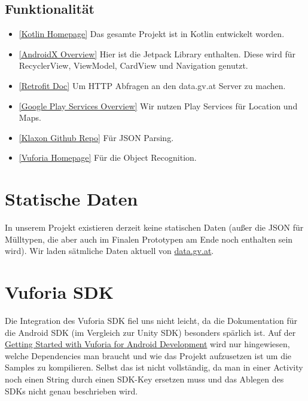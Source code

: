\documentclass{mrtrash}
\begin{document}
\subsection{Funktionalität}

\begin{itemize}
    \item \href{https://kotlinlang.org/}{[Kotlin Homepage]} Das gesamte Projekt ist in Kotlin entwickelt worden.
    \item \href{https://developer.android.com/jetpack/androidx}{[AndroidX Overview]} Hier ist die Jetpack Library enthalten. Diese wird für RecyclerView, ViewModel, CardView und Navigation genutzt.
    \item \href{https://square.github.io/retrofit/}{[Retrofit Doc]} Um HTTP Abfragen an den data.gv.at Server zu machen.
    \item \href{https://developers.google.com/android/guides/overview}{[Google Play Services Overview]} Wir nutzen Play Services für Location und Maps.
    \item \href{https://github.com/cbeust/klaxon}{[Klaxon Github Repo]} Für JSON Parsing.
    \item \href{https://developer.vuforia.com/}{[Vuforia Homepage]} Für die Object Recognition.
\end{itemize}

\section{Statische Daten}

In unserem Projekt existieren derzeit keine statischen Daten (außer die JSON für Mülltypen, die aber auch im Finalen Prototypen am Ende noch enthalten sein wird). Wir laden sätmliche Daten aktuell von \href{https://data.gv.at}{data.gv.at}.

\section{Vuforia SDK}

Die Integration des Vuforia SDK fiel uns nicht leicht, da die Dokumentation für die Android SDK (im Vergleich zur Unity SDK) besonders spärlich ist. Auf der \href{https://library.vuforia.com/articles/Solution/Getting-Started-with-Vuforia-for-Android-Development.html}{Getting Started with Vuforia for Android Development} wird nur hingewiesen, welche Dependencies man braucht und wie das Projekt aufzusetzen ist um die Samples zu kompilieren. Selbst das ist nicht vollständig, da man in einer Activity noch einen String durch einen SDK-Key ersetzen muss und das Ablegen des SDKs nicht genau beschrieben wird.
\end{document}
